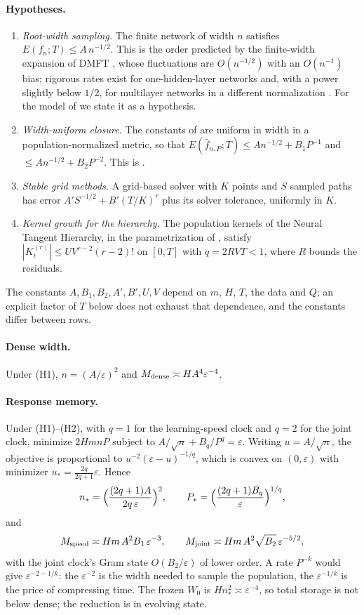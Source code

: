 \documentclass[11pt]{article}
\theoremstyle{definition}
\theoremstyle{remark}
\begin{document}
\paragraph{Hypotheses.}
\begin{enumerate}
\item[(H1)] \emph{Root-width sampling.}  The finite network of width $n$
satisfies $E(f_n;T)\le A\,n^{-1/2}$.  This is the order predicted by the
finite-width expansion of DMFT \citep{bordelon2023finite}, whose fluctuations
are $O(n^{-1/2})$ with an $O(n^{-1})$ bias; rigorous rates exist for
one-hidden-layer networks \citep{mei2018meanfield} and, with a power slightly
below $1/2$, for multilayer networks in a different normalization
\citep{nguyen2023rigorous}.  For the model of  we state it as
a hypothesis.
\item[(H2)] \emph{Width-uniform closure.}  The constants of
 are uniform in width in a population-normalized metric,
so that $E(\hat f_{n,P};T)\le An^{-1/2}+B_1P^{-1}$ and
$\le An^{-1/2}+B_2P^{-2}$.  This is .
\item[(H3)] \emph{Stable grid methods.}  A grid-based solver with $K$ points
and $S$ sampled paths has error $A'S^{-1/2}+B'(T/K)^r$ plus its solver
tolerance, uniformly in $K$.
\item[(H4)] \emph{Kernel growth for the hierarchy.}  The population kernels of
the Neural Tangent Hierarchy, in the parametrization of ,
satisfy $|K^{(r)}_t|\le UV^{r-2}(r-2)!$ on $[0,T]$ with $q=2RVT<1$, where $R$
bounds the residuals.
\end{enumerate}
The constants $A,B_1,B_2,A',B',U,V$ depend on $m$, $H$, $T$, the data and $Q$;
an explicit factor of $T$ below does not exhaust that dependence, and the
constants differ between rows.

\paragraph{Dense width.}
Under (H1), $n=(A/\varepsilon)^2$ and $M_{\rm dense}\asymp HA^4\varepsilon^{-4}$.

\paragraph{Response memory.}
Under (H1)--(H2), with $q=1$ for the learning-speed clock and $q=2$ for the
joint clock, minimize $2HmnP$ subject to $A/\sqrt n+B_q/P^q=\varepsilon$.  Writing
$u=A/\sqrt n$, the objective is proportional to
$u^{-2}(\varepsilon-u)^{-1/q}$, which is convex on $(0,\varepsilon)$ with
minimizer $u_*=\frac{2q}{2q+1}\varepsilon$.  Hence
\[
 n_*=\Bigl(\frac{(2q+1)A}{2q\,\varepsilon}\Bigr)^2,\qquad
 P_*=\Bigl(\frac{(2q+1)B_q}{\varepsilon}\Bigr)^{1/q},
\]
and
\[
 M_{\rm speed}\asymp Hm\,A^2B_1\,\varepsilon^{-3},\qquad
 M_{\rm joint}\asymp Hm\,A^2\sqrt{B_2}\,\varepsilon^{-5/2},
\]
with the joint clock's Gram state $O(B_2/\varepsilon)$ of lower order.  A rate
$P^{-k}$ would give $\varepsilon^{-2-1/k}$: the $\varepsilon^{-2}$ is the width
needed to sample the population, the $\varepsilon^{-1/k}$ is the price of
compressing time.  The frozen $W_0$ is $Hn_*^2\asymp\varepsilon^{-4}$, so total
storage is not below dense; the reduction is in evolving state.
\end{document}
